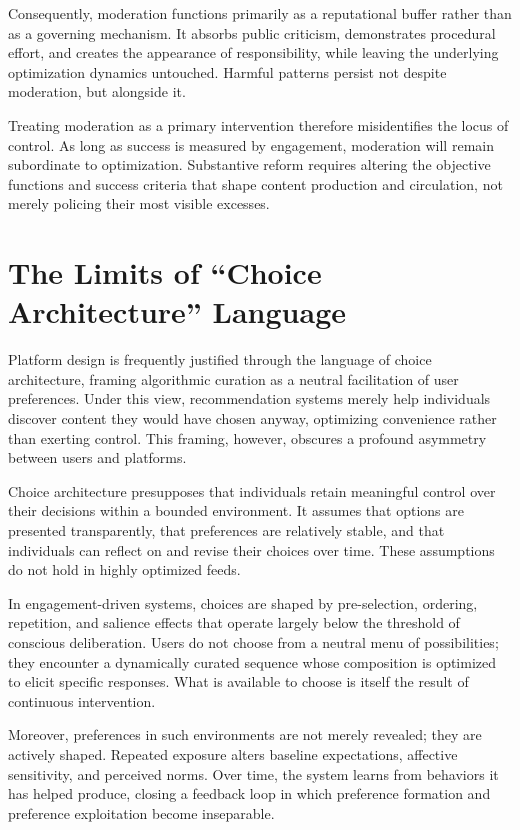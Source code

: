 \documentclass[12pt]{article}
\begin{document}
Consequently, moderation functions primarily as a reputational buffer rather than as a governing mechanism. It absorbs public criticism, demonstrates procedural effort, and creates the appearance of responsibility, while leaving the underlying optimization dynamics untouched. Harmful patterns persist not despite moderation, but alongside it.

Treating moderation as a primary intervention therefore misidentifies the locus of control. As long as success is measured by engagement, moderation will remain subordinate to optimization. Substantive reform requires altering the objective functions and success criteria that shape content production and circulation, not merely policing their most visible excesses.

\section{The Limits of ``Choice Architecture'' Language}

Platform design is frequently justified through the language of choice architecture, framing algorithmic curation as a neutral facilitation of user preferences. Under this view, recommendation systems merely help individuals discover content they would have chosen anyway, optimizing convenience rather than exerting control. This framing, however, obscures a profound asymmetry between users and platforms.

Choice architecture presupposes that individuals retain meaningful control over their decisions within a bounded environment. It assumes that options are presented transparently, that preferences are relatively stable, and that individuals can reflect on and revise their choices over time. These assumptions do not hold in highly optimized feeds.

In engagement-driven systems, choices are shaped by pre-selection, ordering, repetition, and salience effects that operate largely below the threshold of conscious deliberation. Users do not choose from a neutral menu of possibilities; they encounter a dynamically curated sequence whose composition is optimized to elicit specific responses. What is available to choose is itself the result of continuous intervention.

Moreover, preferences in such environments are not merely revealed; they are actively shaped. Repeated exposure alters baseline expectations, affective sensitivity, and perceived norms. Over time, the system learns from behaviors it has helped produce, closing a feedback loop in which preference formation and preference exploitation become inseparable.
\end{document}
